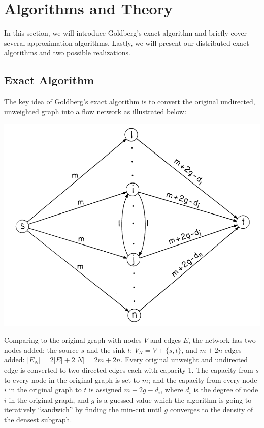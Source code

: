 \documentclass{article}
\begin{document}
\section{Algorithms and Theory}
In this section, we will introduce Goldberg's exact algorithm and briefly cover several approximation algorithms. Lastly, we will present our distributed exact algorithms and two possible realizations.

\subsection{Exact Algorithm}
The key idea of Goldberg's exact algorithm is to convert the original undirected, unweighted graph into a flow network as illustrated below:

\includegraphics[width=\columnwidth]{goldberg_network.png}

Comparing to the original graph with nodes $V$ and edges $E$, the network has two nodes added: the source $s$ and the sink $t$: $V_N = V + \{s, t\}$, and $m + 2n$ edges added: $|E_N| = 2|E| + 2|N| = 2m + 2n$. Every original unweight and undirected edge is converted to two directed edges each with capacity 1. The capacity from $s$ to every node in the original graph is set to $m$; and the capacity from every node $i$ in the original graph to $t$ is assigned $m + 2g - d_i$, where $d_i$ is the degree of node $i$ in the original graph, and $g$ is a guessed value which the algorithm is going to iteratively ``sandwich'' by finding the min-cut until $g$ converges to the density of the densest subgraph.
\end{document}
